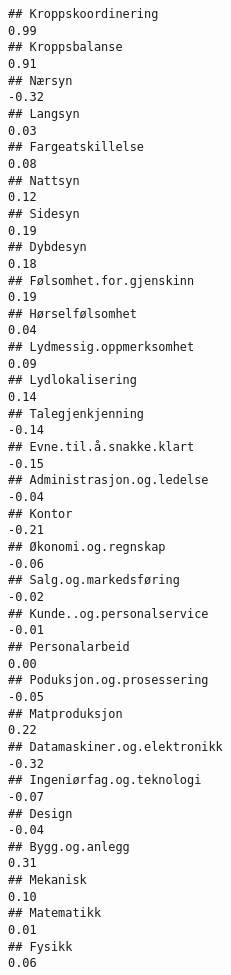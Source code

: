\documentclass[
]{article}
\begin{document}
\begin{verbatim}
## Kroppskoordinering                                                                0.99
## Kroppsbalanse                                                                     0.91
## Nærsyn                                                                           -0.32
## Langsyn                                                                           0.03
## Fargeatskillelse                                                                  0.08
## Nattsyn                                                                           0.12
## Sidesyn                                                                           0.19
## Dybdesyn                                                                          0.18
## Følsomhet.for.gjenskinn                                                           0.19
## Hørselfølsomhet                                                                   0.04
## Lydmessig.oppmerksomhet                                                           0.09
## Lydlokalisering                                                                   0.14
## Talegjenkjenning                                                                 -0.14
## Evne.til.å.snakke.klart                                                          -0.15
## Administrasjon.og.ledelse                                                        -0.04
## Kontor                                                                           -0.21
## Økonomi.og.regnskap                                                              -0.06
## Salg.og.markedsføring                                                            -0.02
## Kunde..og.personalservice                                                        -0.01
## Personalarbeid                                                                    0.00
## Poduksjon.og.prosessering                                                        -0.05
## Matproduksjon                                                                     0.22
## Datamaskiner.og.elektronikk                                                      -0.32
## Ingeniørfag.og.teknologi                                                         -0.07
## Design                                                                           -0.04
## Bygg.og.anlegg                                                                    0.31
## Mekanisk                                                                          0.10
## Matematikk                                                                        0.01
## Fysikk                                                                            0.06

\end{verbatim}
\end{document}
